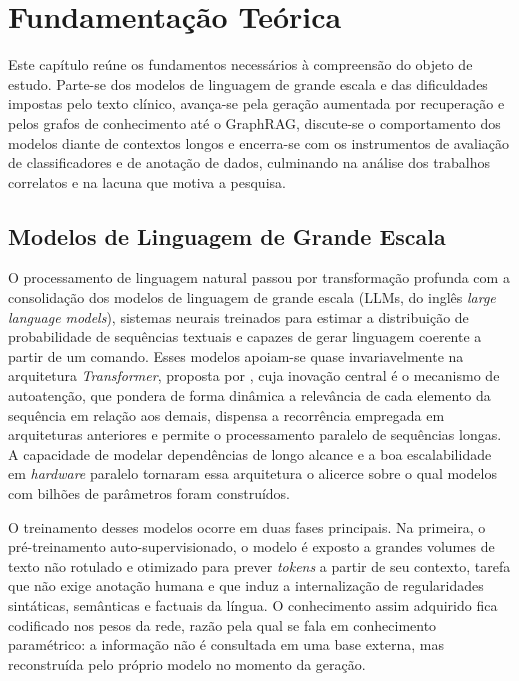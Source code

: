 \chapter{Fundamentação Teórica}\label{cap:fundamentacao}

Este capítulo reúne os fundamentos necessários à compreensão do objeto de estudo. Parte-se dos modelos de linguagem de grande escala e das dificuldades impostas pelo texto clínico, avança-se pela geração aumentada por recuperação e pelos grafos de conhecimento até o GraphRAG, discute-se o comportamento dos modelos diante de contextos longos e encerra-se com os instrumentos de avaliação de classificadores e de anotação de dados, culminando na análise dos trabalhos correlatos e na lacuna que motiva a pesquisa.

\section{Modelos de Linguagem de Grande Escala}\label{sec:llm}

O processamento de linguagem natural passou por transformação profunda com a consolidação dos modelos de linguagem de grande escala (LLMs, do inglês \textit{large language models}), sistemas neurais treinados para estimar a distribuição de probabilidade de sequências textuais e capazes de gerar linguagem coerente a partir de um comando. Esses modelos apoiam-se quase invariavelmente na arquitetura \textit{Transformer}, proposta por \citet{vaswani2017}, cuja inovação central é o mecanismo de autoatenção, que pondera de forma dinâmica a relevância de cada elemento da sequência em relação aos demais, dispensa a recorrência empregada em arquiteturas anteriores e permite o processamento paralelo de sequências longas. A capacidade de modelar dependências de longo alcance e a boa escalabilidade em \textit{hardware} paralelo tornaram essa arquitetura o alicerce sobre o qual modelos com bilhões de parâmetros foram construídos.

O treinamento desses modelos ocorre em duas fases principais. Na primeira, o pré-treinamento auto-supervisionado, o modelo é exposto a grandes volumes de texto não rotulado e otimizado para prever \textit{tokens} a partir de seu contexto, tarefa que não exige anotação humana e que induz a internalização de regularidades sintáticas, semânticas e factuais da língua. O conhecimento assim adquirido fica codificado nos pesos da rede, razão pela qual se fala em conhecimento paramétrico: a informação não é consultada em uma base externa, mas reconstruída pelo próprio modelo no momento da geração.

